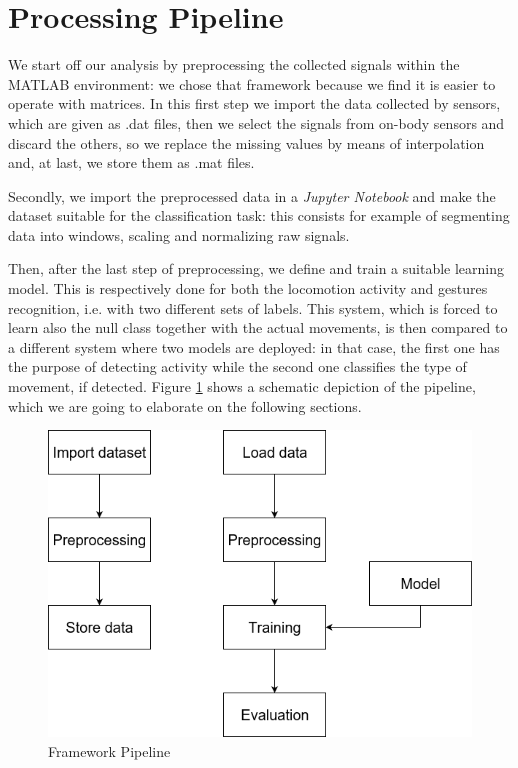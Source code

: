 
\section{Processing Pipeline}
\label{sec:processing_architecture}

We start off our analysis by preprocessing the collected signals within the MATLAB environment: we chose that framework because we find it is easier to operate with matrices. In this first step we import the data collected by sensors, which are given as .dat files, then we select the signals from on-body sensors and discard the others, so we replace the missing values by means of interpolation and, at last, we store them as .mat files.

Secondly, we import the preprocessed data in a \textit{Jupyter Notebook} and make the dataset suitable for the classification task: this consists for example of segmenting data into windows, scaling and normalizing raw signals.

Then, after the last step of preprocessing, we define and train a suitable learning model. This is respectively done for both the locomotion activity and gestures recognition, i.e. with two different sets of labels. This system, which is forced to learn also the null class together with the actual movements, is then compared to a different system where two models are deployed: in that case, the first one has the purpose of detecting activity while the second one classifies the type of movement, if detected. Figure \ref{fig:pipeline} shows a schematic depiction of the pipeline, which we are going to elaborate on the following sections.

\begin{figure}[ht]
	\centering
	\includegraphics[scale=.4]{figure/block_diag}
	\caption{Framework Pipeline}
	\label{fig:pipeline}
\end{figure}

